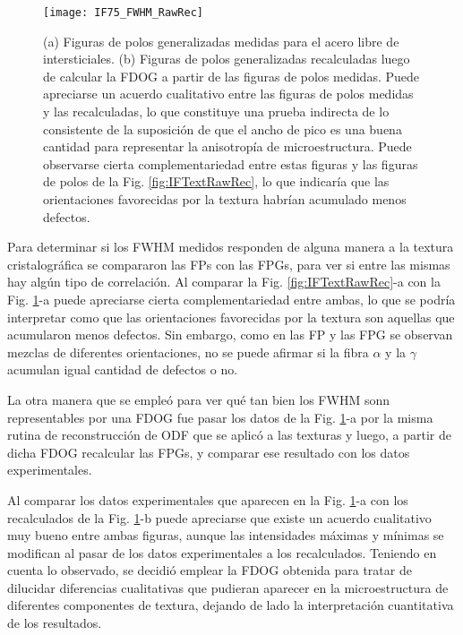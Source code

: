 \begin{figure}[!htb]
  \centering
  \texttt{[image: IF75\_FWHM\_RawRec]}
  \caption{(a) Figuras de polos generalizadas medidas para el acero libre de intersticiales. (b) Figuras de polos generalizadas recalculadas luego de calcular la FDOG a partir de las figuras de polos medidas. Puede apreciarse un acuerdo cualitativo entre las figuras de polos medidas y las recalculadas, lo que constituye una prueba indirecta de lo consistente de la suposición de que el ancho de pico es una buena cantidad para representar la anisotropía de microestructura. Puede observarse cierta complementariedad entre estas figuras y las figuras de polos de la Fig. \ref{fig:IFTextRawRec}, lo que indicaría que las orientaciones favorecidas por la textura habrían acumulado menos defectos.}
  \label{fig:IFFWHMRawRec}
\end{figure}

Para determinar si los FWHM medidos responden de alguna manera a la textura cristalográfica se compararon las FPs con las FPGs, para ver si entre las mismas hay algún tipo de correlación.
Al comparar la Fig. \ref{fig:IFTextRawRec}-a con la Fig. \ref{fig:IFFWHMRawRec}-a puede apreciarse cierta complementariedad entre ambas, lo que se podría interpretar como que las orientaciones favorecidas por la textura son aquellas que acumularon menos defectos.
Sin embargo, como en las FP y las FPG se observan mezclas de diferentes orientaciones, no se puede afirmar si la fibra $\alpha$ y la $\gamma$ acumulan igual cantidad de defectos o no.

La otra manera que se empleó para ver qué tan bien los FWHM sonn representables por una FDOG fue pasar los datos de la Fig. \ref{fig:IFFWHMRawRec}-a por la misma rutina de reconstrucción de ODF que se aplicó a las texturas y luego, a partir de dicha FDOG recalcular las FPGs, y comparar ese resultado con los datos experimentales.

Al comparar los datos experimentales que aparecen en la Fig. \ref{fig:IFFWHMRawRec}-a con los recalculados de la Fig. \ref{fig:IFFWHMRawRec}-b puede apreciarse que existe un acuerdo cualitativo muy bueno entre ambas figuras, aunque las intensidades máximas y mínimas se modifican al pasar de los datos experimentales a los recalculados.
Teniendo en cuenta lo observado, se decidió emplear la FDOG obtenida para tratar de dilucidar diferencias cualitativas que pudieran aparecer en la microestructura de diferentes componentes de textura, dejando de lado la interpretación cuantitativa de los resultados.

